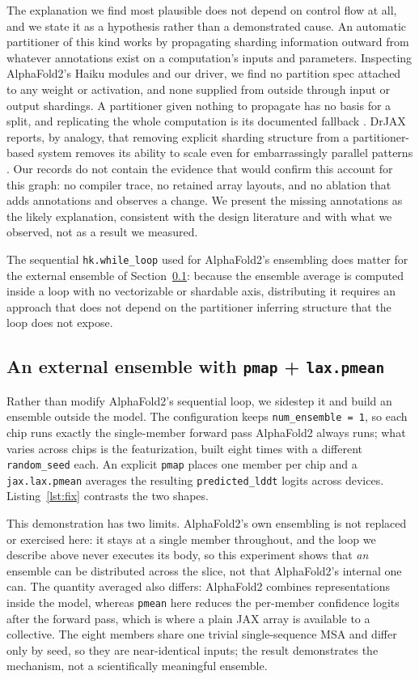 The explanation we find most plausible does not depend on control
flow at all, and we state it as a hypothesis rather than a
demonstrated cause. An automatic partitioner of this kind works by
propagating sharding information outward from whatever annotations
exist on a computation's inputs and parameters. Inspecting AlphaFold2's
Haiku modules and our driver, we find no partition spec attached to
any weight or activation, and none supplied from outside through
input or output shardings. A partitioner given nothing to propagate
has no basis for a split, and replicating the whole computation is
its documented fallback \citep{xu2021gspmd}. DrJAX reports, by
analogy, that removing explicit sharding structure from a
partitioner-based system removes its ability to scale even for
embarrassingly parallel patterns \citep{drjax2024}. Our records do not
contain the evidence that would confirm this account for this graph:
no compiler trace, no retained array layouts, and no ablation that
adds annotations and observes a change. We present the missing
annotations as the likely explanation, consistent with the design
literature and with what we observed, not as a result we measured.

The sequential \texttt{hk.while\_loop} used for AlphaFold2's ensembling
does matter for the external ensemble of Section~\ref{sec:par-fix}:
because the ensemble average is computed inside
a loop with no vectorizable or shardable axis, distributing it
requires an approach that does not depend on the partitioner inferring structure
that the loop does not expose.

\subsection{An external ensemble with \texttt{pmap} + \texttt{lax.pmean}}
\label{sec:par-fix}

Rather than modify AlphaFold2's sequential loop, we sidestep it and build
an ensemble outside the model. The configuration keeps
\texttt{num\_ensemble\,=\,1}, so each chip runs exactly the
single-member forward pass AlphaFold2 always runs; what varies across
chips is the featurization, built eight times with a different
\texttt{random\_seed} each. An explicit \texttt{pmap} places one member
per chip and a \texttt{jax.lax.pmean} averages the resulting
\texttt{predicted\_lddt} logits across devices.
Listing~\ref{lst:fix} contrasts the two shapes.

This demonstration has two limits. AlphaFold2's own ensembling is not
replaced or exercised here: it stays
at a single member throughout, and the loop we describe above never
executes its body, so this experiment shows that \emph{an}
ensemble can be distributed across the slice, not that AlphaFold2's
internal one can. The quantity averaged also differs: AlphaFold2 combines
representations inside the model, whereas \texttt{pmean} here reduces
the per-member confidence logits after the forward pass, which is
where a plain JAX array is available to a collective. The eight members
share one trivial single-sequence MSA and differ only by seed, so they
are near-identical inputs; the result demonstrates the mechanism, not a
scientifically meaningful ensemble.

